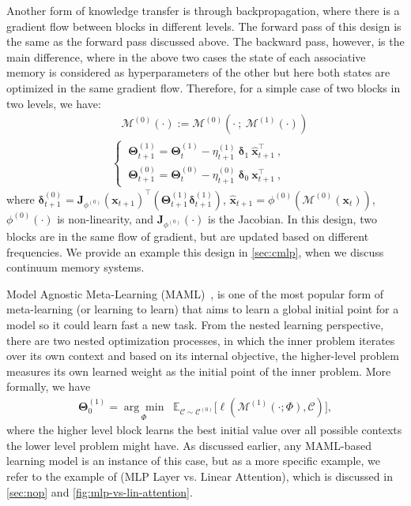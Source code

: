 \documentclass{article}
\newcommand{\citep}{\parencite}
\newcommand{\M}[0]{\mathcal{M}}
\newcommand{\head}[1]{\vspace{1.7mm}\noindent{{\textcolor{c4}{\bf #1.}}}}
\begin{document}
\head{Knowledge Transfer via Backpropagation}
Another form of knowledge transfer is through backpropagation, where there is a gradient flow between blocks in different levels. The forward pass of this design is the same as the forward pass discussed above. The backward pass, however, is the main difference, where in the above two cases the state of each associative memory is considered as hyperparameters of the other but here both states are optimized in the same gradient flow. Therefore, for a simple case of two blocks in two levels, we have:
\begin{align} \tag{Forward Pass}
    &\:\:\:\:\M^{(0)}(\cdot) := \M^{(0)}(\cdot \:;\: \M^{(1)}(\cdot)) \\ \nonumber
    &\begin{cases}
    \:\boldsymbol{\Theta}^{(1)}_{t+1} = \boldsymbol{\Theta}^{(1)}_{t} - \eta^{(1)}_{t+1} \: \boldsymbol{\delta}_{1} \: \hat{\boldsymbol{x}}_{t+1}^{\top}\:,  \\ \tag{Backward Pass}
    \:\boldsymbol{\Theta}^{(0)}_{t+1} = \boldsymbol{\Theta}^{(0)}_{t} - \eta^{(0)}_{t+1} \: \boldsymbol{\delta}_{0} \: \boldsymbol{x}_{t+1}^{\top}\:,
    \end{cases}
\end{align}
where $\boldsymbol{\delta}^{(0)}_{t+1} = \boldsymbol{J}_{\phi^{(0)}} \left( \boldsymbol{x}_{t+1} \right)^{\top} \left( \boldsymbol{\Theta}^{(1)}_{t+1} \boldsymbol{\delta}^{(1)}_{t+1} \right)$, $\hat{\boldsymbol{x}}_{t+1} = \phi^{(0)}(\M^{(0)}(\boldsymbol{x}_t))$, $\phi^{(0)}(\cdot)$ is non-linearity, and $\boldsymbol{J}_{\phi^{(0)}}(\cdot)$ is the Jacobian. In this design, two blocks are in the same flow of gradient, but are updated based on different frequencies. We provide an example this design in \autoref{sec:cmlp}, when we discuss continuum memory systems. 

\head{Knowledge Transfer via Initialization}
Model Agnostic Meta-Learning (MAML)~\citep{finn2017model}, is one of the most popular form of meta-learning (or learning to learn) that aims to learn a global initial point for a model so it could learn fast a new task. From the nested learning perspective, there are two nested optimization processes, in which the inner problem iterates over its own context and based on its internal objective, the higher-level problem measures its own learned weight as the initial point of the inner problem. More formally, we have
\begin{align}
    \boldsymbol{\Theta}^{(1)}_0 =
\underset{\Phi}{\arg\min}
\;\;
\mathbb{E}_{\mathcal{C} \sim \mathcal{C}^{(0)}}
\Biggl[
    \boldsymbol{\ell}(\mathcal{M}^{(1)} \left(\cdot; \Phi\right), \mathcal{C})
\Biggr],
\end{align}
where the higher level block learns the best initial value over all possible contexts the lower level problem might have. As discussed earlier, any MAML-based learning model is an instance of this case, but as a more specific example, we refer to the example of (MLP Layer vs. Linear Attention), which is discussed in \autoref{sec:nop} and \autoref{fig:mlp-vs-lin-attention}. 
\end{document}
